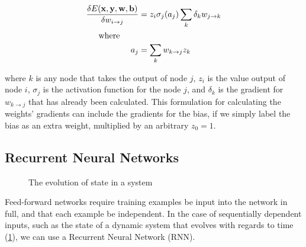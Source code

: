 \documentclass[12pt,a4paper,twoside,openright]{report}
\renewcommand{\vec}[1]{\mathbf{#1}}
\begin{document}
\begin{align}
\frac{\delta E(\vec{x}, \vec{y}, \vec{w}, \vec{b})}{\delta w_{i \rightarrow j}} &= z_i \sigma_j(a_j) \sum_k \delta_k w_{j \rightarrow k}\\
\intertext{\indent where}
a_j &= \sum_k w_{k \rightarrow j} z_k
\end{align}

where $k$ is any node that takes the output of node $j$, $z_i$ is the value output of node $i$,
$\sigma_j$ is the activation function for the node $j$,
and $\delta_k$ is the gradient for $w_{k \rightarrow j}$ that has already been calculated.
This formulation for calculating the weights' gradients can include the gradients for the bias, if we simply
label the bias as an extra weight, multiplied by an arbitrary $z_0 = 1$. 

\subsection{Recurrent Neural Networks}
\label{sec:introRNN}

\begin{figure}[H]
\centering
{}
\caption[States of a dynamic system]{The evolution of state in a system\footnotemark}
\label{fig:seqIn}
\end{figure}

Feed-forward networks require training examples be input into the network in full, and that
each example be independent. In the case of sequentially dependent inputs,
such as the state of a dynamic system that evolves with regards to time (\cref{fig:seqIn}), we can use
a Recurrent Neural Network (RNN).

\end{document}
